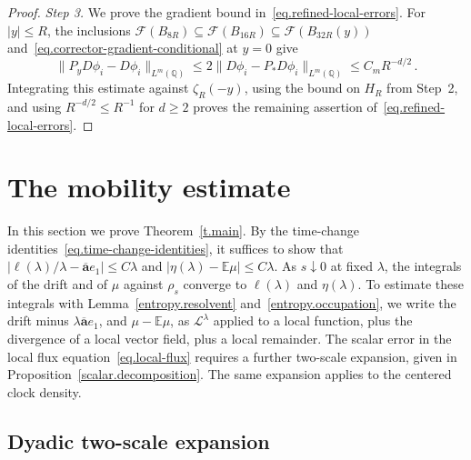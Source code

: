 \documentclass[11pt]{amsart}
\theoremstyle{definition}
\theoremstyle{remark}
\numberwithin{equation}{section}
\newcommand{\E}{\mathbb E}
\newcommand{\Q}{\mathbb Q}
\newcommand{\ahom}{\overline{\mathbf a}}
\begin{document}
\begin{proof}
\emph{Step 3.} We prove the gradient bound in~\eqref{eq.refined-local-errors}. For $|y|\leq R$, the inclusions $\mathcal F(B_{8R})\subseteq\mathcal F(B_{16R})\subseteq\mathcal F(B_{32R}(y))$ and~\eqref{eq.corrector-gradient-conditional} at $y=0$ give
\begin{equation*}
 \|P_yD\phi_i-D\phi_i\|_{L^m(\Q)}
 \leq2\|D\phi_i-P_*D\phi_i\|_{L^m(\Q)}
 \leq C_mR^{-d/2}\, .
\end{equation*}
Integrating this estimate against $\zeta_R(-y)$, using the bound on $H_R$ from Step~2, and using $R^{-d/2}\leq R^{-1}$ for $d\geq2$ proves the remaining assertion of~\eqref{eq.refined-local-errors}.
\end{proof}

\section{The mobility estimate}\label{sec.rate}

In this section we prove Theorem~\ref{t.main}. By the time-change identities~\eqref{eq.time-change-identities}, it suffices to show that $|\ell(\lambda)/\lambda-\ahom e_1|\leq C\lambda$ and $|\eta(\lambda)-\E\mu|\leq C\lambda$. As $s\downarrow0$ at fixed $\lambda$, the integrals of the drift and of $\mu$ against $\rho_s$ converge to $\ell(\lambda)$ and $\eta(\lambda)$. To estimate these integrals with Lemma~\ref{entropy.resolvent} and~\eqref{entropy.occupation}, we write the drift minus $\lambda\ahom e_1$, and $\mu-\E\mu$, as $\mathcal L^\lambda$ applied to a local function, plus the divergence of a local vector field, plus a local remainder. The scalar error in the local flux equation~\eqref{eq.local-flux} requires a further two-scale expansion, given in Proposition~\ref{scalar.decomposition}. The same expansion applies to the centered clock density.

\subsection{Dyadic two-scale expansion}\label{ss.scalar-homogenization}
\end{document}
